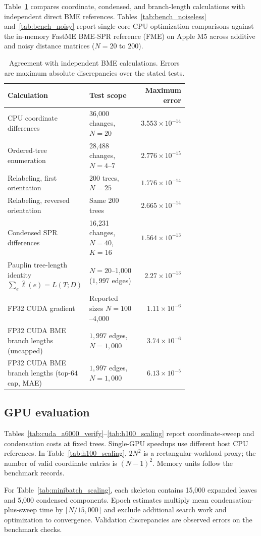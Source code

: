 Table~\ref{tab:validation} compares coordinate, condensed, and branch-length calculations with independent direct BME references.
Tables~\ref{tab:bench_noiseless} and~\ref{tab:bench_noisy} report single-core CPU optimization comparisons against the in-memory FastME BME-SPR reference (FME) on Apple M5 across additive and noisy distance matrices ($N=20$ to $200$).

\begin{table}[!htbp]
\centering
\caption{Agreement with independent BME calculations. Errors are maximum absolute discrepancies over the stated tests.}
\label{tab:validation}
\small
\begin{tabular}{@{}p{0.39\linewidth}p{0.32\linewidth}r@{}}
\toprule
Calculation & Test scope & Maximum error\\
\midrule
CPU coordinate differences & 36,000 changes, $N=20$ & $3.553\times10^{-14}$\\
Ordered-tree enumeration & 28,488 changes, $N=4$--7 & $2.776\times10^{-15}$\\
Relabeling, first orientation & 200 trees, $N=25$ & $1.776\times10^{-14}$\\
Relabeling, reversed orientation & Same 200 trees & $2.665\times10^{-14}$\\
Condensed SPR differences & 16,231 changes, $N=40$, $K=16$ & $1.564\times10^{-13}$\\
Pauplin tree-length identity $\sum_e\hat\ell(e)=L(T;D)$ & $N=20$--1,000 ($1{,}997$ edges) & $2.27\times10^{-13}$\\
FP32 CUDA gradient & Reported sizes $N=100$--4,000 & $1.11\times10^{-6}$\\
FP32 CUDA BME branch lengths (uncapped) & $1{,}997$ edges, $N=1{,}000$ & $3.74\times10^{-6}$\\
FP32 CUDA BME branch lengths (top-$64$ cap, MAE) & $1{,}997$ edges, $N=1{,}000$ & $6.13\times10^{-5}$\\
\bottomrule
\end{tabular}
\end{table}



\clearpage
\subsection{GPU evaluation}
\label{sec:scaling_tables}

Tables~\ref{tab:cuda_a6000_verify}--\ref{tab:h100_scaling} report coordinate-sweep and condensation costs at fixed trees.
Single-GPU speedups use different host CPU references.
In Table~\ref{tab:h100_scaling}, $2N^2$ is a rectangular-workload proxy; the number of valid coordinate entries is $(N-1)^2$.
Memory units follow the benchmark records.

For Table~\ref{tab:minibatch_scaling}, each skeleton contains 15,000 expanded leaves and 5,000 condensed components.
Epoch estimates multiply mean condensation-plus-sweep time by $\lceil N/15{,}000\rceil$ and exclude additional search work and optimization to convergence.
Validation discrepancies are observed errors on the benchmark checks.


